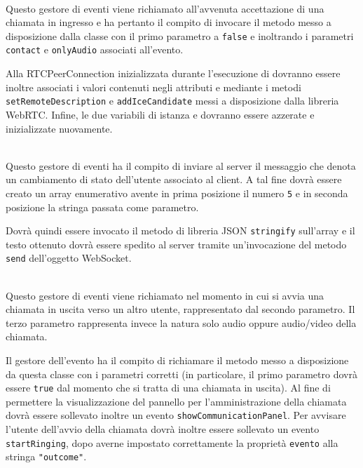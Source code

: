 \begin{description}
  \item{}\\
  Questo gestore di eventi viene richiamato all'avvenuta accettazione di una chiamata in ingresso e ha pertanto il compito di invocare il metodo  messo a disposizione dalla classe con il primo parametro a \verb'false' e inoltrando i parametri \verb'contact' e \verb'onlyAudio' associati all'evento.
  
  Alla RTCPeerConnection inizializzata durante l'esecuzione di  dovranno essere inoltre associati i valori contenuti negli attributi  e  mediante i metodi \verb'setRemoteDescription' e \verb'addIceCandidate' messi a disposizione dalla libreria WebRTC\@. Infine, le due variabili di istanza  e  dovranno essere azzerate e inizializzate nuovamente.
  
  \item{}\\
  Questo gestore di eventi ha il compito di inviare al server il messaggio che denota un cambiamento di stato dell'utente associato al client. A tal fine dovrà essere creato un array enumerativo avente in prima posizione il numero \verb'5' e in seconda posizione la stringa passata come parametro.
  
  Dovrà quindi essere invocato il metodo di libreria JSON \verb'stringify' sull'array e il testo ottenuto dovrà essere spedito al server tramite un'invocazione del metodo \verb'send' dell'oggetto WebSocket.
  
  \item{}\\
  Questo gestore di eventi viene richiamato nel momento in cui si avvia una chiamata in uscita verso un altro utente, rappresentato dal secondo parametro. Il terzo parametro rappresenta invece la natura solo audio oppure audio/video della chiamata.
  
  Il gestore dell'evento ha il compito di richiamare il metodo  messo a disposizione da questa classe con i parametri corretti (in particolare, il primo parametro dovrà essere \verb'true' dal momento che si tratta di una chiamata in uscita). Al fine di permettere la visualizzazione del pannello per l'amministrazione della chiamata dovrà essere sollevato inoltre un evento \verb'showCommunicationPanel'. Per avvisare l'utente dell'avvio della chiamata dovrà inoltre essere sollevato un evento \verb'startRinging', dopo averne impostato correttamente la proprietà \verb'evento' alla stringa \verb'"outcome"'.
  

\end{description}
